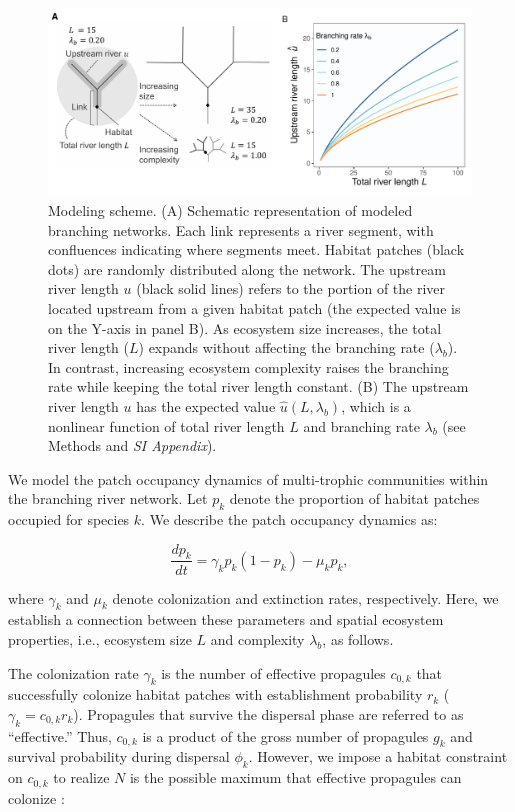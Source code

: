 \documentclass[11pt, class=article, crop=false]{standalone}
\begin{document}
\begin{figure}
    \centering
    \includegraphics[width=\textwidth]{output/fig_theo_scheme.pdf}
    \caption{Modeling scheme. (A) Schematic representation of modeled branching networks. Each link represents a river segment, with confluences indicating where segments meet. Habitat patches (black dots) are randomly distributed along the network. The upstream river length $u$ (black solid lines) refers to the portion of the river located upstream from a given habitat patch (the expected value is on the Y-axis in panel B). As ecosystem size increases, the total river length ($L$) expands without affecting the branching rate ($\lambda_b$). In contrast, increasing ecosystem complexity raises the branching rate while keeping the total river length constant. (B) The upstream river length $u$ has the expected value $\hat{u}(L, \lambda_b)$, which is a nonlinear function of total river length $L$ and branching rate $\lambda_b$ (see Methods and \textit{SI Appendix}).}
    \label{fig:scheme}
\end{figure}

We model the patch occupancy dynamics of multi-trophic communities within the branching river network.
Let $p_k$ denote the proportion of habitat patches occupied for species $k$.
We describe the patch occupancy dynamics as:

\begin{equation}
    \frac{dp_k}{dt} = \gamma_{k} p_k (1 - p_k) - \mu_k p_k,
    \label{eq:model0}
\end{equation}

where $\gamma_k$ and $\mu_k$ denote colonization and extinction rates, respectively.
Here, we establish a connection between these parameters and spatial ecosystem properties, i.e., ecosystem size $L$ and complexity $\lambda_b$, as follows.

The colonization rate $\gamma_k$ is the number of effective propagules $c_{0,k}$ that successfully colonize habitat patches with establishment probability $r_k$ ($\gamma_k = c_{0,k} r_k$).
Propagules that survive the dispersal phase are referred to as ``effective.'' Thus, $c_{0,k}$ is a product of the gross number of propagules $g_k$ and survival probability during dispersal $\phi_k$.
However, we impose a habitat constraint on $c_{0,k}$ to realize $N$ is the possible maximum that effective propagules can colonize \citep{takimoto_effects_2012, terui_spatial_2019}:
\end{document}
